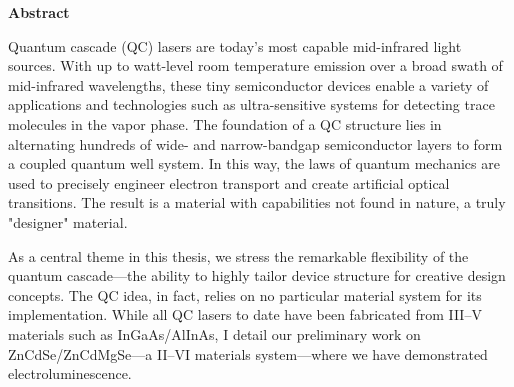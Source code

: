 \cleardoublepage

%

\renewcommand{\voffset}{-14pt}
\renewcommand{\voffset}{-0.25in}
\renewcommand{\headsep}{0.35in}
\renewcommand{\textheight}{8.2in}

\newpage
{}
\begin{center}
  \Large \textbf{Abstract}
\end{center}

\onehalfspacing

Quantum cascade (QC) lasers are today's most capable mid-infrared light sources.  With up to watt-level room temperature emission over a broad swath of mid-infrared wavelengths, these tiny semiconductor devices enable a variety of applications and technologies such as ultra-sensitive systems for detecting trace molecules in the vapor phase.  The foundation of a QC structure lies in alternating hundreds of wide- and narrow-bandgap semiconductor layers to form a coupled quantum well system.  In this way, the laws of quantum mechanics are used to precisely engineer electron transport and create artificial optical transitions.  The result is a material with capabilities not found in nature, a truly "designer" material.

As a central theme in this thesis, we stress the remarkable flexibility of the quantum cascade---the ability to highly tailor device structure for creative design concepts.  The QC idea, in fact, relies on no particular material system for its implementation.  While all QC lasers to date have been fabricated from III--V materials such as InGaAs/AlInAs, I detail our preliminary work on ZnCdSe/ZnCdMgSe---a II--VI materials system---where we have demonstrated electroluminescence.

